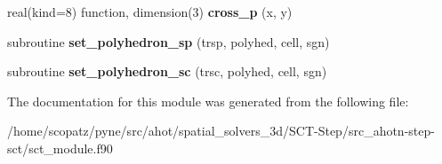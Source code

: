\begin{DoxyCompactItemize}
\item 
\hypertarget{classsct__module_ad149f8f31c02c110bf796ddd9ae50ed3}{real(kind=8) function, dimension(3) {\bfseries cross\-\_\-p} (x, y)}\label{classsct__module_ad149f8f31c02c110bf796ddd9ae50ed3}

\item 
\hypertarget{classsct__module_a43a90e2d39d5a4ea59edb46d8729eff4}{subroutine {\bfseries set\-\_\-polyhedron\-\_\-sp} (trsp, polyhed, cell, sgn)}\label{classsct__module_a43a90e2d39d5a4ea59edb46d8729eff4}

\item 
\hypertarget{classsct__module_ab8166d3e088b06fe79807d7aa629e8e4}{subroutine {\bfseries set\-\_\-polyhedron\-\_\-sc} (trsc, polyhed, cell, sgn)}\label{classsct__module_ab8166d3e088b06fe79807d7aa629e8e4}

\end{DoxyCompactItemize}


The documentation for this module was generated from the following file\-:\begin{DoxyCompactItemize}
\item 
/home/scopatz/pyne/src/ahot/spatial\-\_\-solvers\-\_\-3d/\-S\-C\-T-\/\-Step/src\-\_\-ahotn-\/step-\/sct/sct\-\_\-module.\-f90\end{DoxyCompactItemize}
